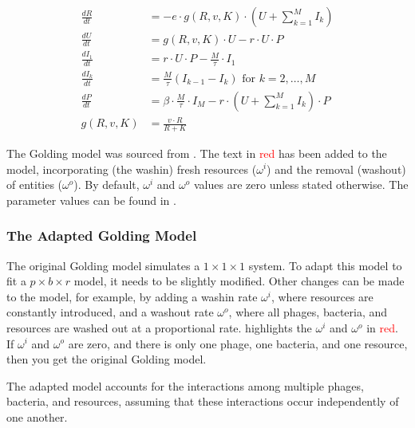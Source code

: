 \begin{eqfloat}[ht!]
    \begin{align}
        \frac{dR}{dt} &= -e \cdot g(R, v, K)\cdot (U + \sum_{k=1}^{M} I_k)\\
        \frac{dU}{dt} &= g(R, v, K)\cdot U - r\cdot U \cdot P\\
        \frac{dI_1}{dt} &= r\cdot U \cdot P - \frac{M}{\tau}\cdot I_1\\
        \frac{dI_k}{dt} &= \frac{M}{\tau}(I_{k-1}-I_k) \text{ for } k=2, \dots, M \\
        \frac{dP}{dt} &= \beta \cdot\frac{M}{\tau} \cdot I_M - r\cdot(U + \sum_{k=1}^{M} I_k)\cdot P \\
        g(R, v, K) &= \frac{v\cdot R}{R + K}
        \label{eq:golding_model}
    \end{align}
    \caption{
        The Golding model was sourced from \citet{gengUsingBacterialPopulation2024}. 
        The text in \textcolor{red}{red} has been added to the model, incorporating (the washin) fresh resources ($\omega^i$) and the removal (washout) of entities ($\omega^o$). 
        By default, $\omega^i$ and $\omega^o$ values are zero unless stated otherwise.
        The parameter values can be found in . 
    }
\end{eqfloat}

\subsubsection{The Adapted Golding Model}
\label{sec:adapted_golding_model}
The original Golding model simulates a $1\times 1 \times 1$ system. 
To adapt this model to fit a $p \times b \times r$ model, it needs to be slightly modified. 
Other changes can be made to the model, for example, by adding a washin rate $\omega^{i}$, where resources are constantly introduced, and a washout rate $\omega^{o}$, where all phages, bacteria, and resources are washed out at a proportional rate. 
 highlights the $\omega^i$ and $\omega^o$ in \textcolor{red}{red}. 
If $\omega^i$ and $\omega^o$ are zero, and there is only one phage, one bacteria, and one resource, then you get the original Golding model. 

The adapted model accounts for the interactions among multiple phages, bacteria, and resources, assuming that these interactions occur independently of one another. 

